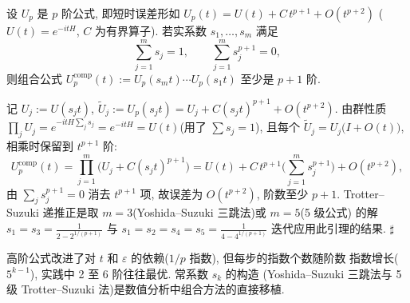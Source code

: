 \documentclass[utf8]{article} %
\numberwithin{equation}{section}   %
\newtheorem{Lem}{\hskip 2em {\color{magenta} 引理}}[subsection]
\newtheorem{Note}{\hskip 2em {\color{red} 注}}[subsection]
\newenvironment{Proof}[1][\relax]{{\noindent\it Proof\ifx\relax#1\relax\else\ (#1)\fi:}\quad}{\hfill $\sharp$\par}
\begin{document}
\begin{Lem}[组合方法提升阶数]
    设 $U_p$ 是 $p$ 阶公式, 即短时误差形如 $U_p(t) = U(t) + C\,t^{p+1} + O(t^{p+2})$
    ($U(t) = e^{-itH}$, $C$ 为有界算子). 若实系数 $s_1, \dots, s_m$ 满足
    \begin{equation}
        \sum_{j=1}^{m} s_j = 1, \qquad \sum_{j=1}^{m} s_j^{p+1} = 0,
    \end{equation}
    则组合公式 $U_p^{\mathrm{comp}}(t) := U_p(s_m t)\cdots U_p(s_1 t)$ 至少是 $p+1$ 阶.
\end{Lem}

\begin{Proof}
    记 $U_j := U(s_j t)$, $\widetilde U_j := U_p(s_j t) = U_j + C(s_j t)^{p+1} + O(t^{p+2})$.
    由群性质 $\prod_j U_j = e^{-itH\sum_j s_j} = e^{-itH} = U(t)$(用了 $\sum s_j = 1$),
    且每个 $\widetilde U_j = U_j\big(I + O(t)\big)$, 相乘时保留到 $t^{p+1}$ 阶:
    \begin{equation}
        U_p^{\mathrm{comp}}(t) = \prod_{j=1}^{m} \Big(U_j + C(s_j t)^{p+1}\Big)
        = U(t) + C\,t^{p+1}\Big(\sum_{j=1}^{m} s_j^{p+1}\Big) + O(t^{p+2}),
    \end{equation}
    由 $\sum_j s_j^{p+1} = 0$ 消去 $t^{p+1}$ 项, 故误差为 $O(t^{p+2})$, 阶数至少 $p+1$.
    Trotter--Suzuki 递推正是取 $m = 3$(Yoshida--Suzuki 三跳法)或 $m = 5$(5 级公式)
    的解 $s_1 = s_3 = \frac{1}{2 - 2^{1/(p+1)}}$ 与
    $s_1 = s_2 = s_4 = s_5 = \frac{1}{4 - 4^{1/(p+1)}}$ 迭代应用此引理的结果.
\end{Proof}

\begin{Note}[阶数与代价的权衡]
    高阶公式改进了对 $t$ 和 $\varepsilon$ 的依赖($1/p$ 指数), 但每步的指数个数随阶数
    指数增长($5^{k-1}$), 实践中 2 至 6 阶往往最优. 常系数 $s_k$ 的构造
    (Yoshida--Suzuki 三跳法与 5 级 Trotter--Suzuki 法)是数值分析中组合方法的直接移植.
\end{Note}
\end{document}
